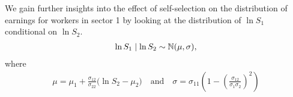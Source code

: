 \begin{frame}
	We gain further insights into the effect of self-selection on the distribution of earnings for workers in sector 1 by looking at the  distribution of $\ln S_1$  conditional on $\ln S_2$.	
	\begin{align*}
	\ln S_1 \mid \ln S_2 \sim \mathbb{N} (\mu, \sigma),
	\end{align*}
	where
	\begin{align*}
	\mu = \mu_1 + \frac{\sigma_{12}}{\sigma_{22}} \Bigg(\ln S_2 - \mu_2\Bigg) \quad\text{and}\quad
	\sigma = \sigma_{11} \left(1 - \left(\frac{\sigma_{12}}{\sigma_1 \sigma_2}\right)^2\right)
	\end{align*}	
\end{frame}